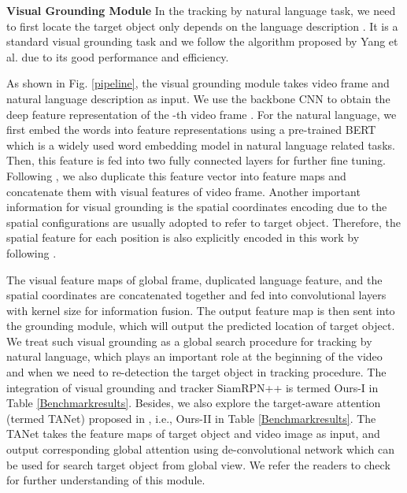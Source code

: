 \documentclass[final]{cvpr}
\begin{document}
\textbf{Visual Grounding Module}  
In the tracking by natural language task, we need to first locate the target object only depends on the language description . It is a standard visual grounding task and we follow the algorithm \cite{yang2019fastgrounding} proposed by Yang et al. due to its good performance and efficiency. 


As shown in Fig. \ref{pipeline}, the visual grounding module takes video frame and natural language description as input. We use the backbone CNN to obtain the deep feature representation of the -th video frame . For the natural language, we first embed the words into feature representations  using a pre-trained BERT \cite{devlin2019bert} which is a widely used word embedding model in natural language related tasks. Then, this feature is fed into two fully connected layers for further fine tuning. Following \cite{yang2019fastgrounding}, we also duplicate this feature vector into feature maps and concatenate them with visual features of video frame. Another important information for visual grounding is the spatial coordinates encoding due to the spatial configurations are usually adopted to refer to target object. Therefore, the spatial feature for each position is also explicitly encoded in this work by following \cite{yang2019fastgrounding}.  




The visual feature maps of global frame, duplicated language feature, and the spatial coordinates are concatenated together and fed into convolutional layers with kernel size  for information fusion. The output feature map is then sent into the grounding module, which will output the predicted location of target object. We treat such visual grounding as a global search procedure for tracking by natural language, which plays an important role at the beginning of the video and when we need to re-detection the target object in tracking procedure. The integration of visual grounding and tracker SiamRPN++ \cite{li2018siamrpn++} is termed Ours-I in Table \ref{Benchmarkresults}. Besides, we also explore the target-aware attention (termed TANet) proposed in \cite{wang2018describe, wang2019GANTrack}, i.e., Ours-II in Table \ref{Benchmarkresults}. The TANet takes the feature maps of target object and video image as input, and output corresponding global attention using de-convolutional network which can be used for search target object from global view. We refer the readers to check \cite{wang2018describe, wang2019GANTrack} for further understanding of this module. 
\end{document}
